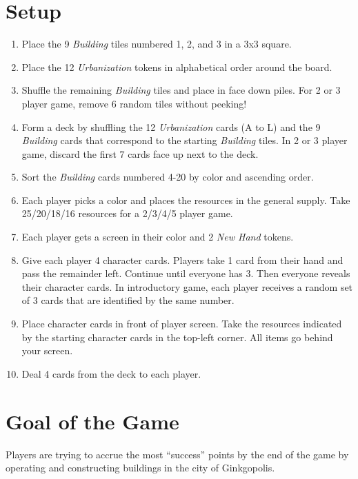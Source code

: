 \documentclass[12pt]{article}
\newenvironment{enumerateCustom}
{\begin{enumerate}
  \setlength{\itemsep}{1pt}
  \setlength{\parskip}{0pt}
  \setlength{\parsep}{0pt}}
{\end{enumerate}}
\begin{document}
\begin{multicols*}{2}

\section*{Setup}
\begin{enumerateCustom}
	\item Place the 9 \emph{Building} tiles numbered 1, 2, and 3 in a 3x3 square.
	\item Place the 12 \emph{Urbanization} tokens in alphabetical order around the board.
	\item Shuffle the remaining \emph{Building} tiles and place in face down piles. For 2 or 3 player game, remove 6 random tiles without peeking!
	\item Form a deck by shuffling the 12 \emph{Urbanization} cards (A to L) and the 9 \emph{Building} cards that correspond to the starting \emph{Building} tiles. In 2 or 3 player game, discard the first 7 cards face up next to the deck.
	\item Sort the \emph{Building} cards numbered 4-20 by color and ascending order.
	\item Each player picks a color and places the resources in the general supply. Take 25/20/18/16 resources for a 2/3/4/5 player game.
	\item Each player gets a screen in their color and 2 \emph{New Hand} tokens.
	\item Give each player 4 character cards. Players take 1 card from their hand and pass the remainder left. Continue until everyone has 3. Then everyone reveals their character cards. In introductory game, each player receives a random set of 3 cards that are identified by the same number.
	\item Place character cards in front of player screen. Take the resources indicated by the starting character cards in the top-left corner. All items go behind your screen.
	\item Deal 4 cards from the deck to each player.
\end{enumerateCustom}

\section*{Goal of the Game}
Players are trying to accrue the most ``success'' points by the end of the game by operating and constructing buildings in the city of Ginkgopolis.


\end{multicols*}
\end{document}
